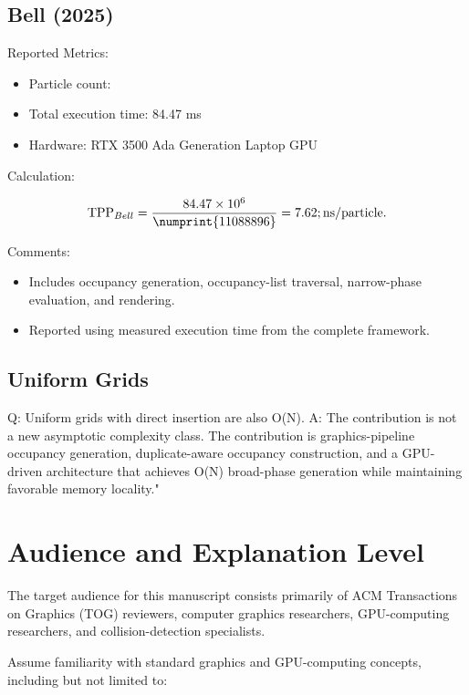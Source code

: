 \subsection{Bell (2025)}

Reported Metrics:

\begin{itemize}
\item Particle count:
\item Total execution time:
84.47 ms
\item Hardware:
RTX 3500 Ada Generation Laptop GPU
\end{itemize}

Calculation:

\begin{equation}
\mathrm{TPP}_{Bell}=\frac{84.47\times10^{6}}{\numprint{11088896}}=7.62;\mathrm{ns/particle}.
\end{equation}

Comments:

\begin{itemize}
\item Includes occupancy generation, occupancy-list traversal,
narrow-phase evaluation, and rendering.
\item Reported using measured execution time from the complete
framework.
\end{itemize}



\subsection{Uniform Grids}
Q: Uniform grids with direct insertion are also O(N).
A: The contribution is not a new asymptotic complexity class. The contribution is graphics-pipeline occupancy generation, duplicate-aware occupancy construction, and a GPU-driven architecture that achieves O(N) broad-phase generation while maintaining favorable memory locality."

\section{Audience and Explanation Level}

The target audience for this manuscript consists primarily of ACM
Transactions on Graphics (TOG) reviewers, computer graphics
researchers, GPU-computing researchers, and collision-detection
specialists.

Assume familiarity with standard graphics and GPU-computing concepts,
including but not limited to:


